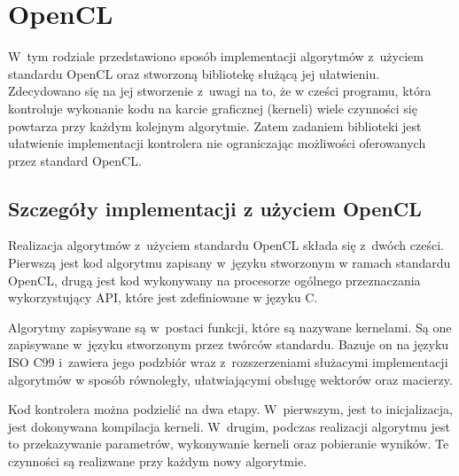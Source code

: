 \chapter{OpenCL}
\label{cha:opencl}

W~tym rodziale przedstawiono sposób implementacji algorytmów z~użyciem standardu OpenCL oraz stworzoną bibliotekę służącą jej ułatwieniu. Zdecydowano się na jej stworzenie z~uwagi na to, że w cześci programu, która kontroluje wykonanie kodu na karcie graficznej (kerneli) wiele czynności się powtarza przy każdym kolejnym algorytmie. Zatem zadaniem biblioteki jest ułatwienie implementacji kontrolera nie ograniczając możliwości oferowanych przez standard OpenCL.

\section{Szczegóły implementacji z użyciem OpenCL}  
\label{sec:szczegolyOpenCL}

Realizacja algorytmów z~użyciem standardu OpenCL składa się z~dwóch cześci. Pierwszą jest kod algorytmu zapisany w~języku stworzonym w ramach standardu OpenCL, drugą jest kod wykonywany na procesorze ogólnego przeznaczania wykorzystujący API, które jest zdefiniowane w języku C.

Algorytmy zapisywane są w~postaci funkcji, które są nazywane kernelami. Są one zapisywane w~języku stworzonym przez twórców standardu. Bazuje on na języku ISO C99 i~zawiera jego podzbiór wraz z~rozszerzeniami służacymi implementacji algorytmów w sposób równoległy, ułatwiającymi obsługę wektorów oraz macierzy. 

Kod kontrolera można podzielić na dwa etapy. W~pierwszym, jest to inicjalizacja, jest dokonywana kompilacja kerneli. W~drugim, podczas realizacji algorytmu jest to przekazywanie parametrów, wykonywanie kerneli oraz pobieranie wyników. Te czynności są realizwane przy każdym nowy algorytmie.